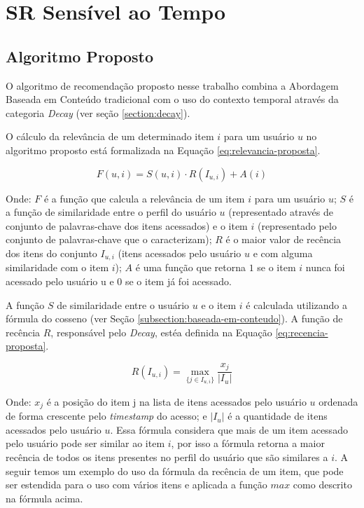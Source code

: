 \chapter{SR Sensível ao Tempo}

\section{Algoritmo Proposto}

O algoritmo de recomendação proposto nesse trabalho combina a Abordagem Baseada em Conteúdo tradicional com o uso do
contexto temporal através da categoria \textit{Decay} (ver seção \ref{section:decay}).

O cálculo da relevância de um determinado item $i$ para um usuário $u$ no algoritmo proposto está formalizada na Equação
\ref{eq:relevancia-proposta}.

\begin{equation}
  F(u,i) = S(u,i) \cdot R(I_{u,i}) + A(i)
  \label{eq:relevancia-proposta}
\end{equation}

Onde: $F$ é a função que calcula a relevância de um item $i$ para um usuário $u$; $S$ é a função de similaridade entre
o perfil do usuário $u$ (representado através de conjunto de palavras-chave dos itens acessados) e o item $i$
(representado pelo conjunto de palavras-chave que o caracterizam); $R$ é o maior valor de recência dos itens do conjunto
$I_{u,i}$ (itens acessados pelo usuário $u$ e com alguma similaridade com o item $i$); $A$ é uma função que retorna $1$
se o item $i$ nunca foi acessado pelo usuário u e $0$ se o item já foi acessado.

A função $S$ de similaridade entre o usuário $u$ e o item $i$ é calculada utilizando a fórmula do cosseno (ver Seção
\ref{subsection:baseada-em-conteudo}). A função de recência $R$, responsável pelo \textit{Decay}, estéa definida na Equação
\ref{eq:recencia-proposta}.

\begin{equation}
  R(I_{u,i}) = \max_{\{j \in I_{u,i}\}}{\frac{x_j}{\left| I_u \right|}}
  \label{eq:recencia-proposta}
\end{equation}

Onde: $x_j$ é a posição do item j na lista de itens acessados pelo usuário $u$ ordenada de forma crescente pelo
\textit{timestamp} do acesso; e $\left| I_u \right|$ é a quantidade de itens acessados pelo usuário $u$. Essa fórmula considera
que mais de um item acessado pelo usuário pode ser similar ao item $i$, por isso a fórmula retorna a maior recência de
todos os itens presentes no perfil do usuário que são similares a $i$. A seguir temos um exemplo do uso da fórmula da
recência de um item, que pode ser estendida para o uso com vários itens e aplicada a função $max$ como descrito na
fórmula acima.

